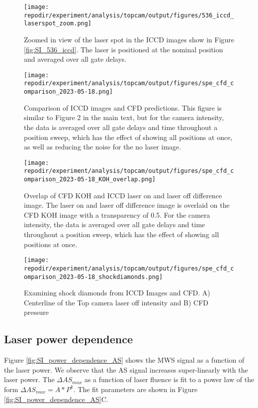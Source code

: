 \begin{figure}
    \centering
    \texttt{[image: \\repodir/experiment/analysis/topcam/output/figures/536\_iccd\_laserspot\_zoom.png]} 
    \caption{Zoomed in view of the laser spot in the ICCD images show in Figure \ref{fig:SI_536_iccd}. The laser is positioned at the nominal position and averaged over all gate delays.}
    \label{fig:SI_536_iccd_laserspot_zoom}
\end{figure}


\begin{figure}[]
\centering
\texttt{[image: \\repodir/experiment/analysis/topcam/output/figures/spe\_cfd\_comparison\_2023-05-18.png]}
\caption{Comparison of ICCD images and CFD predictions. This figure is similar to Figure 2 in the main text, but for the camera intensity, the data is averaged over all gate delays and time throughout a position sweep, which has the effect of showing all positions at once, as well as reducing the noise for the no laser image.}
\label{fig:SI_iccd_cfd_comparison}
\end{figure}


\begin{figure}[]
\centering
\texttt{[image: \\repodir/experiment/analysis/topcam/output/figures/spe\_cfd\_comparison\_2023-05-18\_KOH\_overlap.png]}
\caption{Overlap of CFD KOH and ICCD laser on and laser off difference image. The laser on and laser off difference image is overlaid on the CFD KOH image with a transparency of 0.5. For the camera intensity, the data is averaged over all gate delays and time throughout a position sweep, which has the effect of showing all positions at once.}
\label{fig:SI_iccd_cfd_comparison_KOH_overlap}
\end{figure}

\begin{figure}
    \centering
    \texttt{[image: \\repodir/experiment/analysis/topcam/output/figures/spe\_cfd\_comparison\_2023-05-18\_shockdiamonds.png]} 
    \caption{Examining shock diamonds from ICCD Images and CFD. A) Centerline of the Top camera laser off intensity and B) CFD pressure}
    \label{fig:SI_iccd_cfd_comparison_KOH}
\end{figure}

\subsection{Laser power dependence}

Figure \ref{fig:SI_power_dependence_AS} shows the MWS signal as a function of the laser power. We observe that the AS signal increases super-linearly with the laser power. The $\Delta AS_{max}$ as a function of laser fluence is fit to a power law of the form $\Delta AS_{max} = A * P^k$. The fit parameters are shown in Figure \ref{fig:SI_power_dependence_AS}C.

